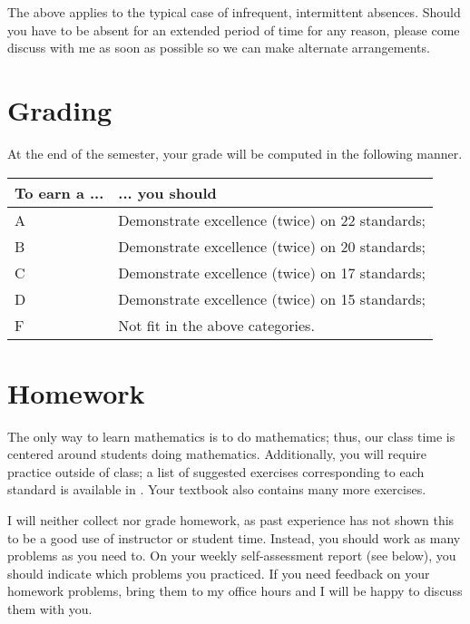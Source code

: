 \documentclass{article}
\begin{document}
The above applies to the typical case of infrequent, intermittent absences. Should you have to be absent for an extended period of time for any reason, please come discuss with me as soon as possible so we can make alternate arrangements.

\noindent \begin{minipage}{\textwidth}
\section*{\fontsize{12}{15}\selectfont Grading}
At the end of the semester, your grade will be computed in the following manner.  \\

\begin{center}
 \begin{tabular}{l|l} 
To earn a  ... & ... you should \\
\hline
A & Demonstrate excellence (twice) on 22 standards;  \\
\hline

B & Demonstrate excellence (twice) on 20 standards; \\
\hline

C 	& Demonstrate excellence (twice) on 17 standards;\\
\hline

D & Demonstrate excellence (twice) on 15 standards;\\
\hline

F 	& Not fit in the above categories. \\
\hline
\end{tabular}
\end{center}
\end{minipage}


\section*{\fontsize{12}{15}\selectfont Homework}
The only way to learn mathematics is to do mathematics; thus, our class time is centered around students doing mathematics.  Additionally, you will require practice outside of class; a list of suggested exercises corresponding to each standard is available in \LMS.  Your textbook also contains many more exercises.

I will neither collect nor grade homework, as past experience has not shown this to be a good use of instructor or student time.  Instead, you should work as many problems as you need to.  On your weekly self-assessment report (see below), you should indicate which problems you practiced. If you need feedback on your homework problems, bring them to my office hours and I will be happy to discuss them with you.
\end{document}
